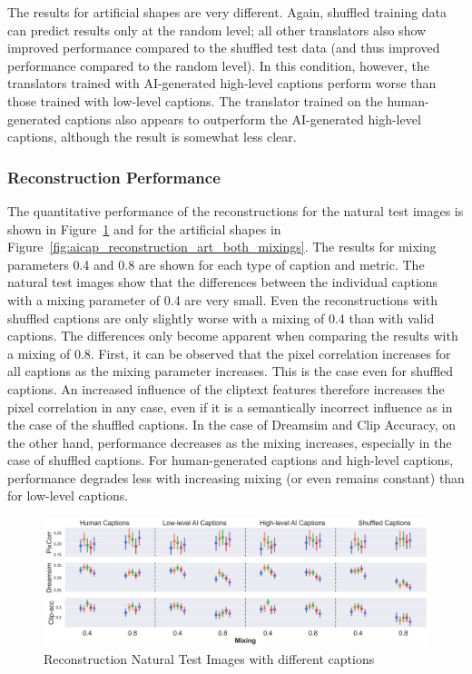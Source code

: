 The results for artificial shapes are very different. Again, shuffled training data can predict results only at the random level; all other translators also show improved performance compared to the shuffled test data (and thus improved performance compared to the random level). In this condition, however, the translators trained with AI-generated high-level captions perform worse than those trained with low-level captions. The translator trained on the human-generated captions also appears to outperform the AI-generated high-level captions, although the result is somewhat less clear. 

\subsubsection{Reconstruction Performance}


The quantitative performance of the reconstructions for the natural test images is shown in Figure~\ref{fig:aicap_reconstruction_test_both_mixings} and for the artificial shapes in Figure~\ref{fig:aicap_reconstruction_art_both_mixings}. The results for mixing parameters 0.4 and 0.8 are shown for each type of caption and metric. The natural test images show that the differences between the individual captions with a mixing parameter of 0.4 are very small. Even the reconstructions with shuffled captions are only slightly worse with a mixing of 0.4 than with valid captions. The differences only become apparent when comparing the results with a mixing of 0.8. First, it can be observed that the pixel correlation increases for all captions as the mixing parameter increases. This is the case even for shuffled captions. An increased influence of the cliptext features therefore increases the pixel correlation in any case, even if it is a semantically incorrect influence as in the case of the shuffled captions. In the case of Dreamsim and Clip Accuracy, on the other hand, performance decreases as the mixing  increases, especially in the case of shuffled captions. For human-generated captions and high-level captions, performance degrades less with increasing mixing (or even remains constant) than for low-level captions. 
\begin{figure}[ht]
    \centering
    \includegraphics[width=1\textwidth]{plots/aicap_reconstruction_test_both_mixings.png}
    \caption{Reconstruction Natural Test Images with different captions}\label{fig:aicap_reconstruction_test_both_mixings}
\end{figure}


